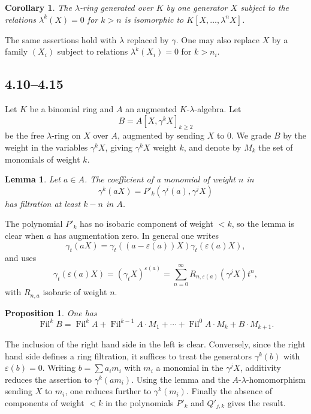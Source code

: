 \documentclass[13pt]{extarticle}
\newcommand{\Fil}{\operatorname{Fil}}
\newtheorem*{proposition}{Proposition}
\newtheorem*{corollary}{Corollary}
\newtheorem*{lemma}{Lemma}
\begin{document}
\begin{corollary}
The $\lambda$-ring generated over $K$ by one generator $X$ subject to the relations $\lambda^k(X)=0$ for $k>n$ is isomorphic to $K[X,\ldots,\lambda^nX]$.
\end{corollary}

The same assertions hold with $\lambda$ replaced by $\gamma$. One may also replace $X$ by a family $(X_i)$ subject to relations $\lambda^k(X_i)=0$ for $k>n_i$.

\subsection*{4.10--4.15}
Let $K$ be a binomial ring and $A$ an augmented $K$-$\lambda$-algebra. Let
\[
B=A[X,\gamma^kX]_{k\geq 2}
\]
be the free $\lambda$-ring on $X$ over $A$, augmented by sending $X$ to $0$. We grade $B$ by the weight in the variables $\gamma^kX$, giving $\gamma^kX$ weight $k$, and denote by $M_k$ the set of monomials of weight $k$.

\begin{lemma}
Let $a\in A$. The coefficient of a monomial of weight $n$ in
\[
\gamma^k(aX)=P'_k(\gamma^i(a),\gamma^jX)
\]
has filtration at least $k-n$ in $A$.
\end{lemma}

The polynomial $P'_k$ has no isobaric component of weight $<k$, so the lemma is clear when $a$ has augmentation zero. In general one writes
\[
\gamma_t(aX)=\gamma_t((a-\varepsilon(a))X)\gamma_t(\varepsilon(a)X),
\]
and uses
\[
\gamma_t(\varepsilon(a)X)=(\gamma_tX)^{\varepsilon(a)}=\sum_{n=0}^{\infty}R_{n,\varepsilon(a)}(\gamma^jX)t^n,
\]
with $R_{n,a}$ isobaric of weight $n$.

\begin{proposition}\label{prop:4.12}
One has
\begin{equation}\label{eq:4.12}
\Fil^kB=\Fil^kA+\Fil^{k-1}A\cdot M_1+\cdots+\Fil^0A\cdot M_k+B\cdot M_{k+1}.
\end{equation}
\end{proposition}

The inclusion of the right hand side in the left is clear. Conversely, since the right hand side defines a ring filtration, it suffices to treat the generators $\gamma^k(b)$ with $\varepsilon(b)=0$. Writing $b=\sum a_im_i$ with $m_i$ a monomial in the $\gamma^jX$, additivity reduces the assertion to $\gamma^k(am_i)$. Using the lemma and the $A$-$\lambda$-homomorphism sending $X$ to $m_i$, one reduces further to $\gamma^k(m_i)$. Finally the absence of components of weight $<k$ in the polynomials $P'_k$ and $Q'_{j,k}$ gives the result.
\end{document}
